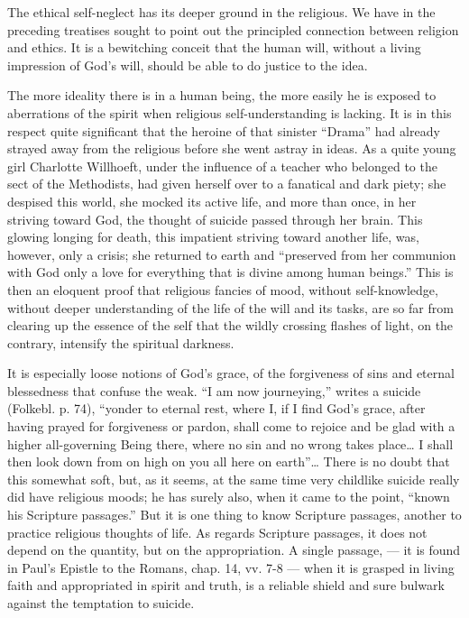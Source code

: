 \documentclass[12pt,a4paper,openany]{book}
\newcommand{\opage}[1]{\marginnote{\footnotesize\textit{[#1]}}}
\begin{document}
The ethical self-neglect has its deeper ground in the religious. We have in the preceding treatises sought to point out the principled connection between religion and ethics. It is a bewitching conceit that the human will, without a living impression of God's will, should be able to do justice to the idea.

The more ideality there is in a human being, the more easily he is exposed to aberrations of the spirit when religious self-understanding is lacking. It is in this respect quite significant that the heroine of that sinister ``Drama'' had already strayed away from the religious before she went astray in ideas. As a quite young girl Charlotte Willhoeft, under the influence of a teacher who
\setcounter{footnote}{0}%
\opage{705}belonged to the sect of the Methodists, had given herself over to a fanatical and dark piety; she despised this world, she mocked its active life, and more than once, in her striving toward God, the thought of suicide passed through her brain. This glowing longing for death, this impatient striving toward another life, was, however, only a crisis; she returned to earth and ``preserved from her communion with God only a love for everything that is divine among human beings.'' This is then an eloquent proof that religious fancies of mood, without self-knowledge, without deeper understanding of the life of the will and its tasks, are so far from clearing up the essence of the self that the wildly crossing flashes of light, on the contrary, intensify the spiritual darkness.

It is especially loose notions of God's grace, of the forgiveness of sins and eternal blessedness that confuse the weak. ``I am now journeying,'' writes a suicide (Folkebl. p. 74), ``yonder to eternal rest, where I, if I find God's grace, after having prayed for forgiveness or pardon, shall come to rejoice and be glad with a higher all-governing Being there, where no sin and no wrong takes place\dots{} I shall then look down from on high on you all here on earth''\dots{} There is no doubt that this somewhat soft, but, as it seems, at the same time very childlike suicide really did have religious moods; he has surely also, when it came to the point, ``known his Scripture passages.'' But it is one thing to know Scripture passages, another to practice religious thoughts of life. As regards Scripture passages, it does not depend on the quantity, but on the appropriation. A single passage,
\setcounter{footnote}{0}%
\opage{706}--- it is found in Paul's Epistle to the Romans, chap. 14, vv. 7-8 --- when it is grasped in living faith and appropriated in spirit and truth, is a reliable shield and sure bulwark against the temptation to suicide.
\end{document}
